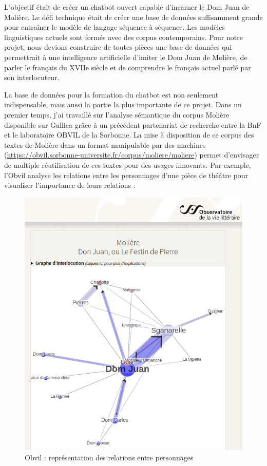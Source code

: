 \documentclass[
  letterpaper,
  DIV=11,
  numbers=noendperiod]{scrreprt}
\begin{document}
L'objectif était de créer un chatbot ouvert capable d'incarner le Dom
Juan de Molière. Le défi technique était de créer une base de données
suffisamment grande pour entraîner le modèle de langage séquence à
séquence. Les modèles linguistiques actuels sont formés avec des corpus
contemporains. Pour notre projet, nous devions construire de toutes
pièces une base de données qui permettrait à une intelligence
artificielle d'imiter le Dom Juan de Molière, de parler le français du
XVIIe siècle et de comprendre le français actuel parlé par son
interlocuteur.

La base de données pour la formation du chatbot est non seulement
indispensable, mais aussi la partie la plus importante de ce projet.
Dans un premier temps, j'ai travaillé sur l'analyse sémantique du corpus
Molière disponible sur Gallica grâce à un précédent partenariat de
recherche entre la BnF et le laboratoire OBVIL de la Sorbonne. La mise à
disposition de ce corpus des textes de Molière dans un format
manipulable par des machines
(\url{https://obvil.sorbonne-universite.fr/corpus/moliere/moliere})
permet d'envisager de multiple réutilisation de ces textes pour des
usages innovants. Par exemple, l'Obvil analyse les relations entre les
personnages d'une pièce de théâtre pour visualiser l'importance de leurs
relations :

\begin{figure}

{\centering \includegraphics{images/obvil_corpus_moliere_moliere_dom-juan-1682.png}

}

\caption{Obvil : représentation des relations entre personnages}

\end{figure}
\end{document}
